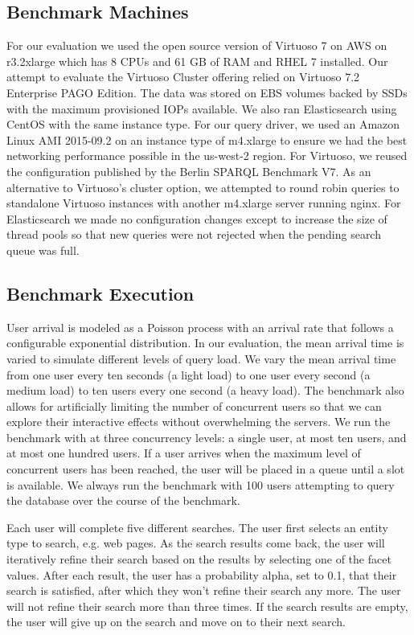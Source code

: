 \subsection{Benchmark Machines}
For our evaluation we used the open source version of Virtuoso 7 on AWS on r3.2xlarge which has 8 CPUs and 61 GB of RAM and RHEL 7 installed.  
Our attempt to evaluate the Virtuoso Cluster offering relied on Virtuoso 7.2 Enterprise PAGO Edition.
The data was stored on EBS volumes backed by SSDs with the maximum provisioned IOPs available. 
We also ran Elasticsearch using CentOS with the same instance type.  
For our query driver, we used an Amazon Linux AMI 2015-09.2 on an instance type of m4.xlarge to ensure we had the best networking performance possible in the us-west-2 region.    
For Virtuoso, we reused the configuration published by the Berlin SPARQL Benchmark V7.
As an alternative to Virtuoso's cluster option, we attempted to round robin queries to standalone Virtuoso instances with another m4.xlarge server running nginx.
For Elasticsearch we made no configuration changes except to increase the size of thread pools so that new queries were not rejected when the pending search queue was full. 

\subsection{Benchmark Execution}
User arrival is modeled as a Poisson process with an arrival rate that follows a configurable exponential distribution.  
In our evaluation, the mean arrival time is varied to simulate different levels of query load.  
We vary the mean arrival time from one user every ten seconds (a light load) to one user every second (a medium load) to ten users every one second (a heavy load).
The benchmark also allows for artificially limiting the number of concurrent users so that we can explore their interactive effects without overwhelming the servers.  
We run the benchmark with at three concurrency levels: a single user, at most ten users, and at most one hundred users.
If a user arrives when the maximum level of concurrent users has been reached, the user will be placed in a queue until a slot is available.  
We always run the benchmark with 100 users attempting to query the database over the course of the benchmark.

Each user will complete five different searches. 
The user first selects an entity type to search, e.g. web pages.
As the search results come back, the user will iteratively refine their search based on the results by selecting one of the facet values.
After each result, the user has a probability alpha, set to 0.1, that their search is satisfied, after which they won't refine their search any more.
The user will not refine their search more than three times.
If the search results are empty, the user will give up on the search and move on to their next search.

